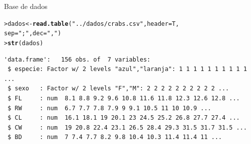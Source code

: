 \documentclass[10pt]{beamer}\usepackage[]{graphicx}\usepackage[]{color}
\makeatletter
\newcommand{\hlstr}[1]{\textcolor[rgb]{0.282,0.239,0.545}{#1}}%
\newcommand{\hlstd}[1]{\textcolor[rgb]{0.345,0.345,0.345}{#1}}%
\newcommand{\hlkwb}[1]{\textcolor[rgb]{0.69,0.353,0.396}{#1}}%
\newcommand{\hlkwc}[1]{\textcolor[rgb]{0.333,0.667,0.333}{#1}}%
\newcommand{\hlkwd}[1]{\textcolor[rgb]{0.282,0.239,0.545}{\textbf{#1}}}%
\newenvironment{kframe}{%
 \def\at@end@of@kframe{}%
 \ifinner\ifhmode%
  \def\at@end@of@kframe{\end{minipage}}%
  \begin{minipage}{\columnwidth}%
 \fi\fi%
 \def\FrameCommand##1{\hskip\@totalleftmargin \hskip-\fboxsep
 \colorbox{shadecolor}{##1}\hskip-\fboxsep
     \hskip-\linewidth \hskip-\@totalleftmargin \hskip\columnwidth}%
 \MakeFramed {\advance\hsize-\width
   \@totalleftmargin\z@ \linewidth\hsize
   \@setminipage}}%
 {\par\unskip\endMakeFramed%
 \at@end@of@kframe}
\newenvironment{knitrout}{}{} %
\makeatother
\begin{document}
\begin{frame}[fragile=singleslide]{Base de dados}
\begin{knitrout}\small
{}\color{fgcolor}\begin{kframe}
\begin{alltt}
\hlstd{> }\hlstd{dados} \hlkwb{<-} \hlkwd{read.table}\hlstd{(}\hlstr{"../dados/crabs.csv"}\hlstd{,} \hlkwc{header} \hlstd{= T,}
\hlstd{  }                    \hlkwc{sep} \hlstd{=} \hlstr{";"}\hlstd{,} \hlkwc{dec} \hlstd{=} \hlstr{","}\hlstd{)}
\hlstd{> }\hlkwd{str}\hlstd{(dados)}
\end{alltt}
\begin{verbatim}
'data.frame':	156 obs. of  7 variables:
 $ especie: Factor w/ 2 levels "azul","laranja": 1 1 1 1 1 1 1 1 1 1 ...
 $ sexo   : Factor w/ 2 levels "F","M": 2 2 2 2 2 2 2 2 2 2 ...
 $ FL     : num  8.1 8.8 9.2 9.6 10.8 11.6 11.8 12.3 12.6 12.8 ...
 $ RW     : num  6.7 7.7 7.8 7.9 9 9.1 10.5 11 10 10.9 ...
 $ CL     : num  16.1 18.1 19 20.1 23 24.5 25.2 26.8 27.7 27.4 ...
 $ CW     : num  19 20.8 22.4 23.1 26.5 28.4 29.3 31.5 31.7 31.5 ...
 $ BD     : num  7 7.4 7.7 8.2 9.8 10.4 10.3 11.4 11.4 11 ...
\end{verbatim}
\end{kframe}
\end{knitrout}

\end{frame}
\end{document}
